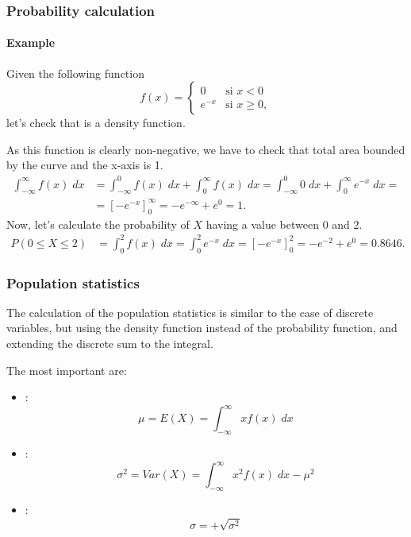 \begin{frame}
\frametitle{Probability calculation}
\framesubtitle{Example}
Given the following function
\[
f(x) =
\begin{cases}
0 & \mbox{si $x<0$}\\
e^{-x} & \mbox{si $x\geq 0$},
\end{cases}
\]
let's check that is a density function. 

As this function is clearly non-negative, we have to check that total area bounded by the curve and the x-axis is 1.
\begin{align*}
\int_{-\infty}^\infty f(x)\;dx &= \int_{-\infty}^0 f(x)\;dx +\int_0^\infty f(x)\;dx = \int_{-\infty}^0 0\;dx +\int_0^\infty e^{-x}\;dx =\\
&= \left[-e^{-x}\right]_0^{\infty} = -e^{-\infty}+e^0 = 1.
\end{align*}
Now, let's calculate the probability of $X$ having a value between 0 and 2. 
\begin{align*}
P(0\leq X\leq 2) &= \int_0^2 f(x)\;dx = \int_0^2 e^{-x}\;dx = \left[-e^{-x}\right]_0^2 = -e^{-2}+e^0 = 0.8646.
\end{align*}
\end{frame}


\begin{frame}
\frametitle{Population statistics}
The calculation of the population statistics is similar to the case of discrete variables, but using the density
function instead of the probability function, and extending the discrete sum to the integral.

The most important are:
\begin{itemize}
\item {}:
\[
\mu = E(X) = \int_{-\infty}^\infty x f(x)\; dx
\]
\item {}:
\[
\sigma^2 = Var(X) = \int_{-\infty}^\infty x^2f(x)\; dx -\mu^2
\]
\item {}:
\[
\sigma = +\sqrt{\sigma^2}
\]
\end{itemize}
\end{frame}


